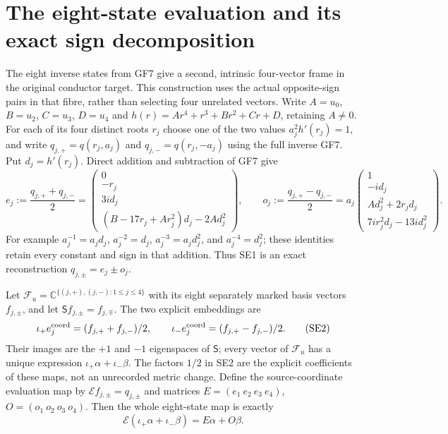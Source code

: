 \documentclass[11pt]{article}
\newcommand{\C}{\mathbb C}
\begin{document}
\section{The eight-state evaluation and its exact sign decomposition}
The eight inverse states from GF7 give a second, intrinsic four-vector
frame in the original conductor target. This construction uses the actual
opposite-sign pairs in that fibre, rather than selecting four unrelated
vectors. Write $A=u_0$, $B=u_2$, $C=u_3$, $D=u_4$ and
$h(r)=Ar^4+r^3+Br^2+Cr+D$, retaining $A\ne0$.
For each of its four distinct roots $r_j$ choose one of the two values
$a_j^2 h'(r_j)=1$, and write $q_{j,+}=q(r_j,a_j)$ and
$q_{j,-}=q(r_j,-a_j)$ using the full inverse GF7. Put $d_j=h'(r_j)$.
Direct addition and subtraction of GF7 give
\[
 e_j:=\frac{q_{j,+}+q_{j,-}}2=
 \begin{pmatrix}0\\-r_j\\3i d_j\\
 (B-17r_j+Ar_j^2)d_j-2A d_j^2\end{pmatrix},\qquad
 o_j:=\frac{q_{j,+}-q_{j,-}}2=
 a_j\begin{pmatrix}1\\-i d_j\\A d_j^2+2r_jd_j\\
 7ir_j^2d_j-13i d_j^2\end{pmatrix}.
 \tag{SE1}
\]
For example $a_j^{-1}=a_jd_j$, $a_j^{-2}=d_j$,
$a_j^{-3}=a_jd_j^2$, and $a_j^{-4}=d_j^2$; these identities
retain every constant and sign in that addition. Thus SE1 is an exact
reconstruction $q_{j,\pm}=e_j\pm o_j$.

Let $\mathcal F_u=\C^{\{(j,+),(j,-):1\le j\le4\}}$ with its
eight separately marked basis vectors $f_{j,\pm}$, and let
$\mathsf S f_{j,\pm}=f_{j,\mp}$. The two explicit embeddings are
\[
 \iota_+e_j^{\rm coord}=(f_{j,+}+f_{j,-})/2,\qquad
 \iota_-e_j^{\rm coord}=(f_{j,+}-f_{j,-})/2.
 \tag{SE2}
\]
Their images are the $+1$ and $-1$ eigenspaces of $\mathsf S$;
every vector of $\mathcal F_u$ has a unique expression
$\iota_+\alpha+\iota_-\beta$. The factors $1/2$ in SE2 are the
explicit coefficients of these maps, not an unrecorded metric change.
Define the source-coordinate evaluation map by
$\mathcal E f_{j,\pm}=q_{j,\pm}$ and matrices
$E=(e_1\ e_2\ e_3\ e_4)$, $O=(o_1\ o_2\ o_3\ o_4)$.
Then the whole eight-state map is exactly
\[
 \mathcal E(\iota_+\alpha+\iota_-\beta)=E\alpha+O\beta.
 \tag{SE3}
\]
\end{document}
